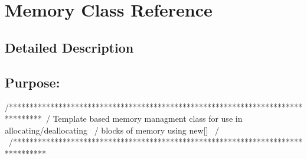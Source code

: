 \hypertarget{class_memory}{}\section{Memory Class Reference}
\label{class_memory}


\subsection{Detailed Description}
\subsection*{{\bfseries Purpose\+:} }

\begin{DoxyVerb}/********************************************************************************\
/  Template based memory managment class for use in allocating/deallocating      \
/  blocks of memory using new[]                                                  \
/                                                                                \
/********************************************************************************\
\end{DoxyVerb}


